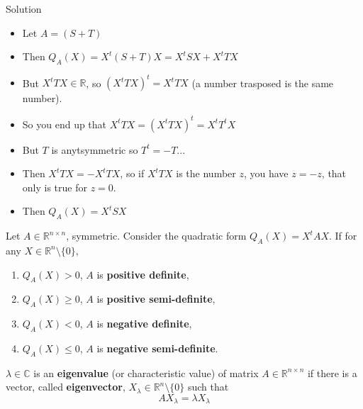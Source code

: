 \documentclass[aspectratio=169]{beamer}
\begin{document}
\begin{frame}{Solution}
    
    \begin{itemize}
        \item Let $A = (S+T)$
        \item Then $Q_A(X) = X^t(S+T)X = X^tSX + X^tTX$
        \item But $X^tTX\in \mathbb{R}$, so $(X^tTX)^t=X^tTX$ (a number trasposed is the same number).
        \item So you end up that $X^tTX = (X^tTX)^t = X^tT^tX$
        \item But $T$ is anytsymmetric so $T^t = -T$...
        \item Then $X^tTX = -X^tTX$, so if $X^tTX$ is the number $z$, you have $z=-z$, that only is true for $z=0$.
        \item Then $Q_A(X) = X^tSX$
    \end{itemize}
    
\end{frame}

\begin{frame}
    \begin{definition}
        Let $A\in\mathbb{R}^{n\times n}$, symmetric. Consider the quadratic form $Q_A(X)=X^t A X$. If for any $X\in\mathbb{R}^n\setminus\{0\}$,
        \begin{enumerate}
            \item $Q_A(X)>0$, $A$ is \textbf{positive definite}, \item $Q_A(X)\geq0$, $A$ is \textbf{positive semi-definite}, \item $Q_A(X)<0$, $A$ is \textbf{negative definite}, \item $Q_A(X)\leq0$, $A$ is \textbf{negative semi-definite}.
        \end{enumerate}
    \end{definition}
\end{frame}

\begin{frame}
    \begin{definition}
        $\lambda\in\mathbb{C}$ is an \textbf{eigenvalue} (or characteristic value) of matrix $A\in\mathbb{R}^{n\times n}$ if there is a vector, called \textbf{eigenvector}, $X_\lambda\in\mathbb{R}^n\setminus\{0\}$ such that $$A X_\lambda = \lambda X_\lambda$$
    \end{definition}
    
\end{frame}
\end{document}

